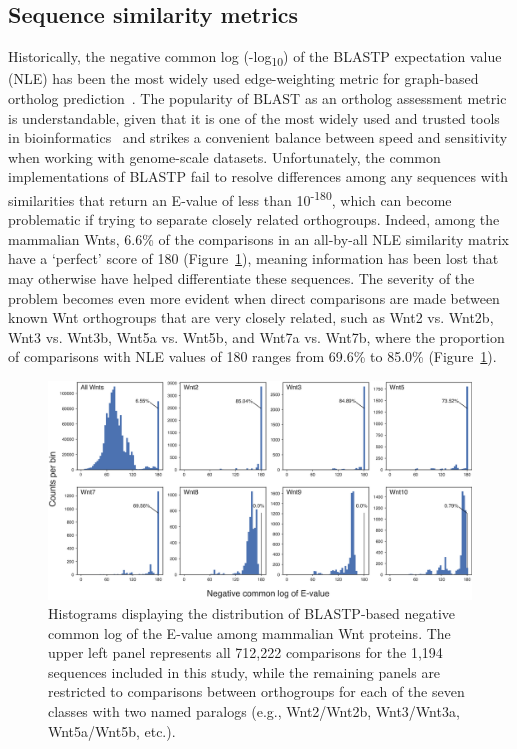 \documentclass[twocolumn]{bmcart}  %
\begin{document}
\subsection{Sequence similarity metrics}\label{subsec:sequenceSimilarityMetrics}
Historically, the negative common log (-log\textsubscript{10}) of the BLASTP expectation value (NLE) has been the most widely used edge-weighting metric for graph-based ortholog prediction~\cite{Enright:2002uq,Li:2003en,Gibbons:2015be}.
The popularity of BLAST as an ortholog assessment metric is understandable, given that it is one of the most widely used and trusted tools in bioinformatics~\cite{Altschul:1990dy} and strikes a convenient balance between speed and sensitivity when working with genome-scale datasets.
Unfortunately, the common implementations of BLASTP fail to resolve differences among any sequences with similarities that return an E-value of less than 10\textsuperscript{-180}, which can become problematic if trying to separate closely related orthogroups.
Indeed, among the mammalian Wnts, 6.6\% of the comparisons in an all-by-all NLE similarity matrix have a `perfect' score of 180 (Figure~\ref{fig:NLEdistributions}), meaning information has been lost that may otherwise have helped differentiate these sequences.
The severity of the problem becomes even more evident when direct comparisons are made between known Wnt orthogroups that are very closely related, such as Wnt2 vs. Wnt2b, Wnt3 vs. Wnt3b, Wnt5a vs. Wnt5b, and Wnt7a vs. Wnt7b, where the proportion of comparisons with NLE values of 180 ranges from 69.6\% to 85.0\% (Figure~\ref{fig:NLEdistributions}).


\begin{figure}[t]
  \begin{center}
  \includegraphics[height=0.34\textheight]{../figures/NLE_distributions.eps}
\end{center}
\caption{Histograms displaying the distribution of BLASTP-based negative common log of the E-value among mammalian Wnt proteins.
The upper left panel represents all 712,222 comparisons for the 1,194 sequences included in this study, while the remaining panels are restricted to comparisons between orthogroups for each of the seven classes with two named paralogs (e.g., Wnt2/Wnt2b, Wnt3/Wnt3a, Wnt5a/Wnt5b, etc.).}
\label{fig:NLEdistributions}
\end{figure}
\end{document}
